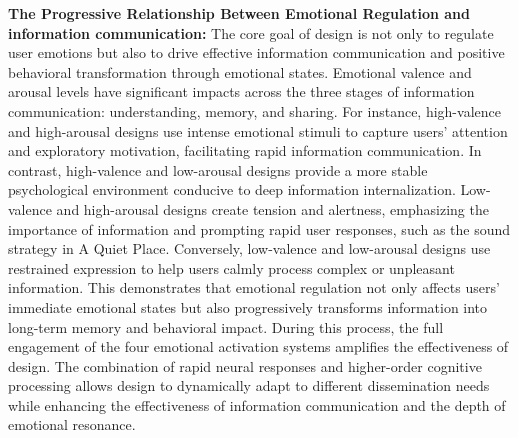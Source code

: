 \textbf{The Progressive Relationship Between Emotional Regulation and information communication:} 
The core goal of design is not only to regulate user emotions but also to drive effective information communication and positive behavioral transformation through emotional states. Emotional valence and arousal levels have significant impacts across the three stages of information communication: understanding, memory, and sharing. For instance, high-valence and high-arousal designs use intense emotional stimuli to capture users’ attention and exploratory motivation, facilitating rapid information communication. In contrast, high-valence and low-arousal designs provide a more stable psychological environment conducive to deep information internalization. Low-valence and high-arousal designs create tension and alertness, emphasizing the importance of information and prompting rapid user responses, such as the sound strategy in A Quiet Place. Conversely, low-valence and low-arousal designs use restrained expression to help users calmly process complex or unpleasant information. This demonstrates that emotional regulation not only affects users’ immediate emotional states but also progressively transforms information into long-term memory and behavioral impact. During this process, the full engagement of the four emotional activation systems amplifies the effectiveness of design. The combination of rapid neural responses and higher-order cognitive processing allows design to dynamically adapt to different dissemination needs while enhancing the effectiveness of information communication and the depth of emotional resonance.

